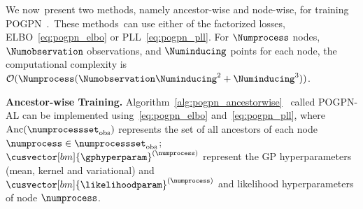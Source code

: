 We now present two methods, namely ancestor-wise and node-wise, for training POGPN . These methods can use either of the factorized losses, ELBO~\eqref{eq:pogpn_elbo} or PLL~\eqref{eq:pogpn_pll}. For $\Numprocess$ nodes, $\Numobservation$ observations, and $\Numinducing$ points for each node, the computational complexity is $\mathcal{O}(\Numprocess(\Numobservation\Numinducing^2+\Numinducing^3))$.

\textbf{Ancestor-wise Training.}
Algorithm~\ref{alg:pogpn_ancestorwise}  called POGPN-AL can be implemented using~\eqref{eq:pogpn_elbo} and~\eqref{eq:pogpn_pll}, where $\text{Anc}(\numprocessset_{\text{obs}})$ represents the set of all ancestors of each node $\numprocess\in\numprocessset_{\text{obs}}$; $\cusvector[bm]{\gphyperparam}^{(\numprocess)}$ represent the GP hyperparameters (mean, kernel and variational) and $\cusvector[bm]{\likelihoodparam}^{(\numprocess)}$ and likelihood hyperparameters of node $\numprocess$.
